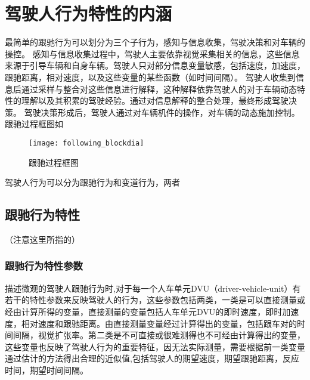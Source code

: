\chapter{驾驶人行为特性的内涵}
最简单的跟驰行为可以划分为三个子行为，感知与信息收集，驾驶决策和对车辆的操控。
感知与信息收集过程中，驾驶人主要依靠视觉采集相关的信息，这些信息来源于引导车辆和自身车辆。驾驶人只对部分信息变量敏感，包括速度，加速度，跟驰距离，相对速度，以及这些变量的某些函数（如时间间隔）。
驾驶人收集到信息后通过采样与整合对这些信息进行解释，这种解释依靠驾驶人的对于车辆动态特性的理解以及其积累的驾驶经验。通过对信息解释的整合处理，最终形成驾驶决策。
驾驶决策形成后，驾驶人通过对车辆机件的操作，对车辆的动态施加控制。跟驰过程框图如


\begin{figure}[htpb]
	\centering
	\label{following_blockdia}
	\texttt{[image: following\_blockdia]}
	\caption{跟驰过程框图}
\end{figure}

驾驶人行为可以分为跟驰行为和变道行为，两者

\section{跟驰行为特性}
（注意这里所指的）
\subsection{跟驰行为特性参数}
描述微观的驾驶人跟驰行为时,对于每一个人车单元DVU（driver-vehicle-unit）有若干的特性参数来反映驾驶人的行为，这些参数包括两类，一类是可以直接测量或经由计算所得的变量，直接测量的变量包括人车单元DVU的即时速度，即时加速度，相对速度和跟驰距离。由直接测量变量经过计算得出的变量，包括跟车对的时间间隔，视觉扩张率。第二类是不可直接或很难测得也不可经由计算得出的变量，这些变量也反映了驾驶人行为的重要特征，因无法实际测量，需要根据前一类变量通过估计的方法得出合理的近似值,包括驾驶人的期望速度，期望跟驰距离，反应时间，期望时间间隔。
